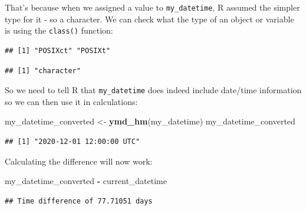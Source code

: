 \documentclass[
  12pt,
  krantz2]{krantz}
\makeatletter
\newenvironment{Shaded}{\begin{snugshade}}{\end{snugshade}}
\newcommand{\KeywordTok}[1]{\textcolor[rgb]{0.13,0.29,0.53}{\textbf{#1}}}
\newcommand{\NormalTok}[1]{#1}
\newcommand{\OperatorTok}[1]{\textcolor[rgb]{0.81,0.36,0.00}{\textbf{#1}}}
\newcommand{\StringTok}[1]{\textcolor[rgb]{0.31,0.60,0.02}{#1}}
\newenvironment{kframe}{%
\medskip{}
\setlength{\fboxsep}{.8em}
 \def\at@end@of@kframe{}%
 \ifinner\ifhmode%
  \def\at@end@of@kframe{\end{minipage}}%
  \begin{minipage}{\columnwidth}%
 \fi\fi%
 \def\FrameCommand##1{\hskip\@totalleftmargin \hskip-\fboxsep
 \colorbox{shadecolor}{##1}\hskip-\fboxsep
     \hskip-\linewidth \hskip-\@totalleftmargin \hskip\columnwidth}%
 \MakeFramed {\advance\hsize-\width
   \@totalleftmargin\z@ \linewidth\hsize
   \@setminipage}}%
 {\par\unskip\endMakeFramed%
 \at@end@of@kframe}
\renewenvironment{Shaded}{\begin{kframe}}{\end{kframe}}
\makeatother
\begin{document}
That's because when we assigned a value to \texttt{my\_datetime}, R assumed the simpler type for it - so a character.
We can check what the type of an object or variable is using the \texttt{class()} function:

\begin{Shaded}
\end{Shaded}

\begin{verbatim}
## [1] "POSIXct" "POSIXt"
\end{verbatim}

\begin{Shaded}
\end{Shaded}

\begin{verbatim}
## [1] "character"
\end{verbatim}

So we need to tell R that \texttt{my\_datetime} does indeed include date/time information so we can then use it in calculations:

\begin{Shaded}
\begin{Highlighting}[]
\NormalTok{my_datetime_converted <-}\StringTok{ }\KeywordTok{ymd_hm}\NormalTok{(my_datetime)}
\NormalTok{my_datetime_converted}
\end{Highlighting}
\end{Shaded}

\begin{verbatim}
## [1] "2020-12-01 12:00:00 UTC"
\end{verbatim}

Calculating the difference will now work:

\begin{Shaded}
\begin{Highlighting}[]
\NormalTok{my_datetime_converted }\OperatorTok{-}\StringTok{ }\NormalTok{current_datetime}
\end{Highlighting}
\end{Shaded}

\begin{verbatim}
## Time difference of 77.71051 days
\end{verbatim}
\end{document}
